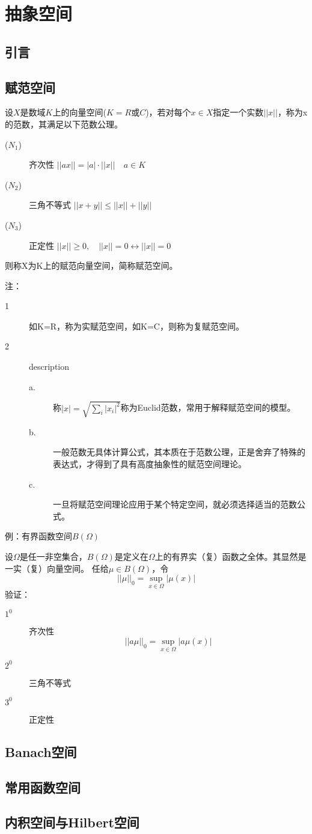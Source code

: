\chapter{抽象空间}\label{chap:introduction}

\section{引言}

\section{赋范空间}
设$X$是数域$K$上的向量空间($K=R$或$C$)，若对每个$x\in X$指定一个实数$||x||$，称为x的范数，其满足以下范数公理。
\indent
\begin{description}
	\item[($N_1$)] 齐次性     \quad\qquad $||ax||=|a|\cdot||x||\quad a\in K$
	\item[($N_2$)] 三角不等式 \quad $||x+y|| \leq ||x|| + ||y||$
	\item[($N_3$)] 正定性     \quad\qquad $||x||\geq 0,\quad ||x||=0 \leftrightarrow  ||x||=0$
\end{description}
则称X为K上的赋范向量空间，简称赋范空间。

\noindent 注：
\begin{description}
	\item[1] 如K=R，称为实赋范空间，如K=C，则称为复赋范空间。
    \item[2] description
    \begin{description}
    	\item[a.] 称$|x| = \sqrt{\sum_i |x_i|^2}$称为Euclid范数，常用于解释赋范空间的模型。
    	\item[b.] 一般范数无具体计算公式，其本质在于范数公理，正是舍弃了特殊的表达式，才得到了具有高度抽象性的赋范空间理论。
    	\item[c.] 一旦将赋范空间理论应用于某个特定空间，就必须选择适当的范数公式。
    \end{description}
\end{description}


\noindent 
例：{\heiti 有界函数空间$B(\Omega)$}

设$\Omega$是任一非空集合，$B(\Omega)$是定义在$\Omega$上的有界实（复）函数之全体。其显然是一实（复）向量空间。
任给$\mu\in B(\Omega)$，令
$$||\mu||_0 =  \sup_{x\in\Omega} |\mu(x)|$$
\noindent 验证：
\begin{description}
	\item[$1^0$] 齐次性
	  $$||a\mu||_0 =  \sup_{x\in\Omega} |a\mu(x)|$$
	\item[$2^0$] 三角不等式
		
	\item[$3^0$] 正定性
\end{description}
\section{Banach空间}

\section{常用函数空间}

\section{内积空间与Hilbert空间}
